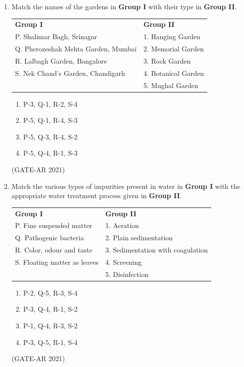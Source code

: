 \documentclass[a4paper,10pt]{article}
\begin{document}
\begin{enumerate}
    \item Match the names of the gardens in \textbf{Group I} with their type in \textbf{Group II}. \\
    \begin{tabular}{ l l }
    \textbf{Group I} & \textbf{Group II} \\
    P. Shalimar Bagh, Srinagar & 1. Hanging Garden \\
    Q. Pherozeshah Mehta Garden, Mumbai & 2. Memorial Garden \\
    R. Lalbagh Garden, Bangalore & 3. Rock Garden \\
    S. Nek Chand's Garden, Chandigarh & 4. Botanical Garden \\
    & 5. Mughal Garden \\
    \end{tabular}
    \begin{multicols}{2}
    \begin{enumerate}
        \item P-3, Q-1, R-2, S-4
        \item P-5, Q-1, R-4, S-3
        \item P-5, Q-3, R-4, S-2
        \item P-5, Q-4, R-1, S-3
    \end{enumerate}
    \end{multicols}
    \hfill (GATE-AR 2021)

    \item Match the various types of impurities present in water in \textbf{Group I} with the appropriate water treatment process given in \textbf{Group II}. \\
    \begin{tabular}{ l l }
    \textbf{Group I} & \textbf{Group II} \\
    P. Fine suspended matter & 1. Aeration \\
    Q. Pathogenic bacteria & 2. Plain sedimentation \\
    R. Color, odour and taste & 3. Sedimentation with coagulation \\
    S. Floating matter as leaves & 4. Screening \\
    & 5. Disinfection \\
    \end{tabular}
    \begin{multicols}{2}
    \begin{enumerate}
        \item P-2, Q-5, R-3, S-4
        \item P-3, Q-4, R-1, S-2
        \item P-1, Q-4, R-3, S-2
        \item P-3, Q-5, R-1, S-4
    \end{enumerate}
    \end{multicols}
    \hfill (GATE-AR 2021)


\end{enumerate}
\end{document}
